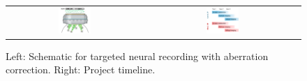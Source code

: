\begin{figure}[h!]\vspace{-0.2cm}
	\begin{center}
		\begin{tabular}{cccc}
			\includegraphics[width= 0.25\textwidth]{figs/timeline/illust.pdf}&&
		\includegraphics[width= 0.25\textwidth]{figs/timeline/timeline2.pdf}
		\end{tabular}\vspace{-0.6cm}
	\end{center}
	\caption{Left: Schematic for targeted neural recording with aberration correction. Right: Project timeline.  } 
\vspace{-0.5cm}
\label{fig:timeline}
\end{figure}

